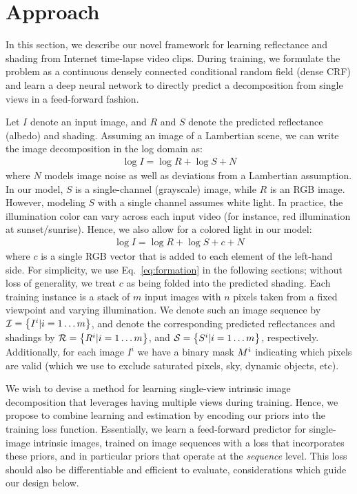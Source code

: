 \documentclass[10pt,twocolumn,letterpaper]{article}
\begin{document}
\section{Approach}\label{sec:approach}

In this section, we describe our novel framework for learning
reflectance and shading from Internet time-lapse video clips. During
training, we formulate the problem as a continuous densely connected
conditional random field (dense CRF) and learn a deep neural network
to directly predict a decomposition from single views in a
feed-forward fashion.

\smallskip{} Let $I$ denote an input image,
and $R$ and $S$ denote the predicted reflectance (albedo) and
shading. Assuming an image of a Lambertian scene, we can write the
image decomposition in the log domain as:
\begin{align}
  \log I = \log R + \log S + N
\label{eq:formation}
\end{align}
where $N$ models image noise as well as deviations from a Lambertian
assumption. In our model, $S$ is a single-channel (grayscale) image,
while $R$ is an RGB image.
However, modeling $S$ with a single channel assumes white light. In
practice, the illumination color can vary across each input video (for
instance, red illumination at sunset/sunrise).
Hence, we also allow for a colored light in our model:
\begin{align}
  \log I = \log R + \log S + c + N
\label{eq:formation_with_color}
\end{align}
where $c$ is a single RGB vector that is added to each element of the
left-hand side.
For simplicity, we use Eq.~\ref{eq:formation} in the following
sections; without loss of generality, we treat $c$ as being folded
into the predicted shading.
Each training instance is a stack of $m$ input images with $n$ pixels taken from a fixed viewpoint and varying illumination. We denote such an image
sequence by $\mathcal{I} = \left \{ I^i | i = 1 \ldots m \right \}$, and
denote the corresponding predicted reflectances and shadings by
$\mathcal{R} = \left \{ R^i | i = 1 \ldots m \right \}$, and
$\mathcal{S} = \left \{ S^i | i = 1 \ldots m \right \}$,
respectively. Additionally, for each image $I^i$ we have a binary mask
$M^i$ indicating which pixels are valid (which we use to exclude
saturated pixels, sky, dynamic objects, etc).

We wish to devise a method for learning single-view intrinsic image
decomposition that leverages having multiple views during training.
Hence, we propose to combine learning and estimation
by encoding our priors into the training loss function. Essentially,
we learn a feed-forward predictor for single-image intrinsic images,
trained on image sequences with a loss that incorporates these priors,
and in particular priors that operate at the {\em sequence} level.
This loss should also be differentiable and efficient to evaluate,
considerations which guide our design below.
\end{document}
